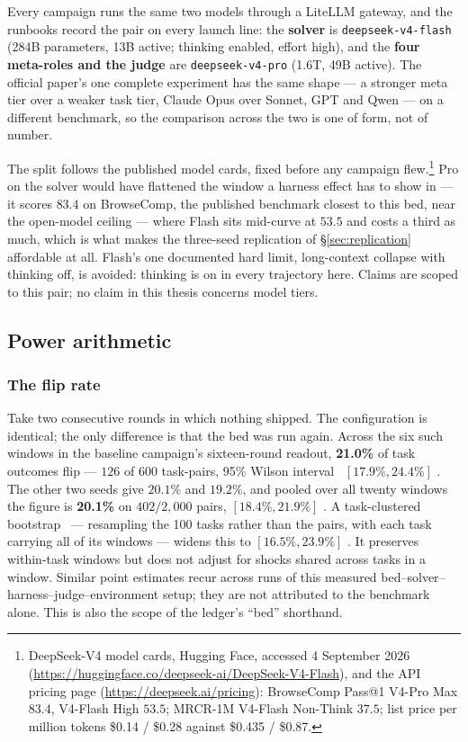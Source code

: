 Every campaign runs the same two models through a LiteLLM gateway, and the
runbooks record the pair on every launch line: the \textbf{solver} is
\texttt{deepseek-v4-flash} (284B parameters, 13B active; thinking enabled,
effort high), and the \textbf{four meta-roles and the judge} are
\texttt{deepseek-v4-pro} (1.6T, 49B active). The official paper's one
complete experiment has the same shape --- a stronger meta tier over a
weaker task tier, Claude Opus over Sonnet, GPT and Qwen --- on a different
benchmark, so the comparison across the two is one of form, not of
number.

The split follows the published model cards, fixed before any campaign
flew.\footnote{DeepSeek-V4 model cards, Hugging Face, accessed 4 September
2026 (\url{https://huggingface.co/deepseek-ai/DeepSeek-V4-Flash}), and the
API pricing page (\url{https://deepseek.ai/pricing}): BrowseComp Pass@1
V4-Pro Max $83.4$, V4-Flash High $53.5$; MRCR-1M V4-Flash Non-Think
$37.5$; list price per million tokens \$0.14 / \$0.28 against \$0.435 /
\$0.87.} Pro on the solver would have flattened the window a harness
effect has to show in --- it scores $83.4$ on BrowseComp, the published
benchmark closest to this bed, near the open-model ceiling --- where Flash
sits mid-curve at $53.5$ and costs a third as much, which is what makes
the three-seed replication of \S\ref{sec:replication} affordable at all.
Flash's one documented hard limit, long-context collapse with thinking
off, is avoided: thinking is on in every trajectory here.  Claims are scoped to this pair; no claim in this thesis
concerns model tiers.

\subsection{Power arithmetic}
\label{sec:power}

\subsubsection*{The flip rate}

Take two consecutive rounds in which nothing shipped. The configuration is
identical; the only difference is that the bed was run again. Across the
six such windows in the baseline campaign's sixteen-round readout,
\textbf{21.0\%} of task outcomes flip --- $126$ of $600$ task-pairs, 95\%
Wilson interval~\cite{wilson-1927} $[17.9\%, 24.4\%]$ . The other two seeds give
$20.1\%$ and $19.2\%$, and pooled over all twenty windows the figure is
\textbf{20.1\%} on $402/2{,}000$ pairs, $[18.4\%, 21.9\%]$ . A
task-clustered bootstrap~\cite{efron-1979} --- resampling the 100 tasks rather than the pairs,
with each task carrying all of its windows --- widens this to $[16.5\%,
23.9\%]$ . It preserves within-task windows but does not adjust for
shocks shared across tasks in a window. Similar point estimates recur
across runs of this measured bed--solver--harness--judge--environment setup;
they are not attributed to the benchmark alone. This is also the scope of the ledger's ``bed'' shorthand.

